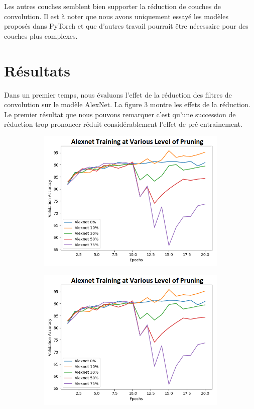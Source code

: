 \documentclass[12pt]{article}
\begin{document}
Les autres couches semblent bien supporter la réduction de couches de convolution. Il est à noter que nous avons uniquement essayé les modèles proposés dans PyTorch et que d'autres travail pourrait être nécessaire pour des couches plus complexes. 

\section*{Résultats}
Dans un premier temps, nous évaluons l’effet de la réduction des filtres de convolution sur le modèle AlexNet. La figure 3 montre les effets de la réduction. Le premier résultat que nous pouvons remarquer c’est qu’une succession de réduction trop prononcer réduit considérablement l’effet de pré-entrainement. 
\begin{figure}[H]
	\centering
	\begin{subfigure}[b]{0.5\textwidth}            
		\includegraphics[width=\textwidth]{prune_ratio_rough}
		\label{fig:pruneratiorough}
	\end{subfigure}%
	\begin{subfigure}[b]{0.5\textwidth}
		\centering
		\includegraphics[width=\textwidth]{prune_ratio_slow}

\end{subfigure}
\end{figure}
\end{document}
